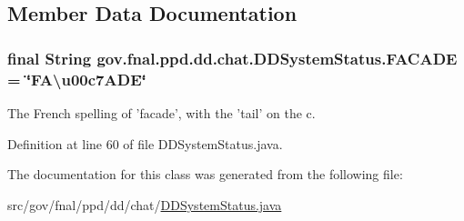 \subsection{Member Data Documentation}
\hypertarget{classgov_1_1fnal_1_1ppd_1_1dd_1_1chat_1_1DDSystemStatus_a4a11894738a02fa522ea3ca3b8523cae}{
\subsubsection[{F\-A\-C\-A\-D\-E}]{\setlength{\rightskip}{0pt plus 5cm}final String gov.\-fnal.\-ppd.\-dd.\-chat.\-D\-D\-System\-Status.\-F\-A\-C\-A\-D\-E = \char`\"{}F\-A\textbackslash{}u00c7\-A\-D\-E\char`\"{}\hspace{0.3cm}{\ttfamily [static]}}}\label{classgov_1_1fnal_1_1ppd_1_1dd_1_1chat_1_1DDSystemStatus_a4a11894738a02fa522ea3ca3b8523cae}
The French spelling of 'facade', with the 'tail' on the c. 

Definition at line 60 of file D\-D\-System\-Status.\-java.



The documentation for this class was generated from the following file\-:\begin{DoxyCompactItemize}
\item 
src/gov/fnal/ppd/dd/chat/\hyperlink{DDSystemStatus_8java}{D\-D\-System\-Status.\-java}\end{DoxyCompactItemize}
